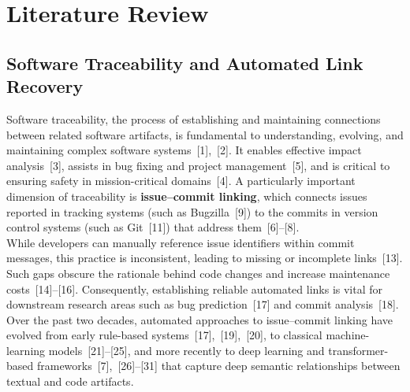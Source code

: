 \section{Literature Review}

\subsection{Software Traceability and Automated Link Recovery}
Software traceability, the process of establishing and maintaining connections between related software artifacts, is fundamental to understanding, evolving, and maintaining complex software systems~[1],~[2]. It enables effective impact analysis~[3], assists in bug fixing and project management~[5], and is critical to ensuring safety in mission-critical domains~[4].  
A particularly important dimension of traceability is \textbf{issue–commit linking}, which connects issues reported in tracking systems (such as Bugzilla~[9]) to the commits in version control systems (such as Git~[11]) that address them~[6]–[8].\\

While developers can manually reference issue identifiers within commit messages, this practice is inconsistent, leading to missing or incomplete links~[13]. Such gaps obscure the rationale behind code changes and increase maintenance costs~[14]–[16]. Consequently, establishing reliable automated links is vital for downstream research areas such as bug prediction~[17] and commit analysis~[18].  
Over the past two decades, automated approaches to issue–commit linking have evolved from early rule-based systems~[17],~[19],~[20], to classical machine-learning models~[21]–[25], and more recently to deep learning and transformer-based frameworks~[7],~[26]–[31] that capture deep semantic relationships between textual and code artifacts.

